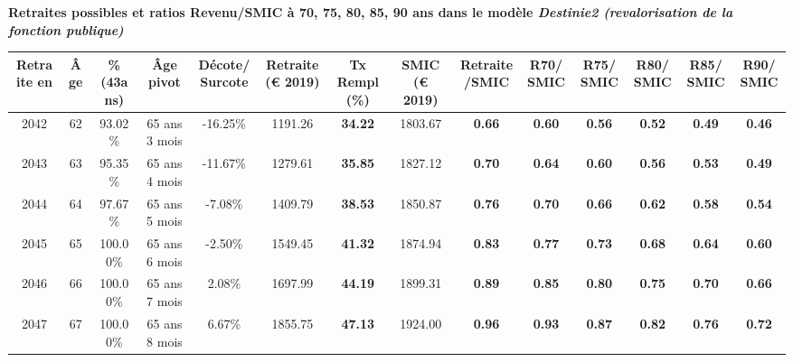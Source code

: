  \vspace{0.1cm} 
{\bf \noindent Retraites possibles et ratios Revenu/SMIC à 70, 75, 80, 85, 90 ans dans le modèle \emph{Destinie2 (revalorisation de la fonction publique)}}  
 
\begin{adjustbox}{max width=\textwidth} 
\begin{tabular}[htb]{|c|c||c|c|c||c|c||c|c||c|c|c|c|c|} 
\hline 
 Retraite en &  Âge &  \%(43ans) &  Âge pivot &  Décote/Surcote &  Retraite (\euro{} 2019) &  Tx Rempl(\%) &  SMIC (\euro{} 2019) &  Retraite/SMIC &  R70/SMIC &  R75/SMIC &  R80/SMIC &  R85/SMIC &  R90/SMIC \\ 
\hline \hline 
 2042 &  62 &  93.02\% &  65 ans 3 mois &  -16.25\% &  1191.26 &  {\bf 34.22} &  1803.67 &  {\bf {\color{red} 0.66}} &  {\bf {\color{red} 0.60}} &  {\bf {\color{red} 0.56}} &  {\bf {\color{red} 0.52}} &  {\bf {\color{red} 0.49}} &  {\bf {\color{red} 0.46}} \\ 
\hline 
 2043 &  63 &  95.35\% &  65 ans 4 mois &  -11.67\% &  1279.61 &  {\bf 35.85} &  1827.12 &  {\bf {\color{red} 0.70}} &  {\bf {\color{red} 0.64}} &  {\bf {\color{red} 0.60}} &  {\bf {\color{red} 0.56}} &  {\bf {\color{red} 0.53}} &  {\bf {\color{red} 0.49}} \\ 
\hline 
 2044 &  64 &  97.67\% &  65 ans 5 mois &  -7.08\% &  1409.79 &  {\bf 38.53} &  1850.87 &  {\bf {\color{red} 0.76}} &  {\bf {\color{red} 0.70}} &  {\bf {\color{red} 0.66}} &  {\bf {\color{red} 0.62}} &  {\bf {\color{red} 0.58}} &  {\bf {\color{red} 0.54}} \\ 
\hline 
 2045 &  65 &  100.00\% &  65 ans 6 mois &  -2.50\% &  1549.45 &  {\bf 41.32} &  1874.94 &  {\bf {\color{red} 0.83}} &  {\bf {\color{red} 0.77}} &  {\bf {\color{red} 0.73}} &  {\bf {\color{red} 0.68}} &  {\bf {\color{red} 0.64}} &  {\bf {\color{red} 0.60}} \\ 
\hline 
 2046 &  66 &  100.00\% &  65 ans 7 mois &  2.08\% &  1697.99 &  {\bf 44.19} &  1899.31 &  {\bf {\color{red} 0.89}} &  {\bf {\color{red} 0.85}} &  {\bf {\color{red} 0.80}} &  {\bf {\color{red} 0.75}} &  {\bf {\color{red} 0.70}} &  {\bf {\color{red} 0.66}} \\ 
\hline 
 2047 &  67 &  100.00\% &  65 ans 8 mois &  6.67\% &  1855.75 &  {\bf 47.13} &  1924.00 &  {\bf {\color{red} 0.96}} &  {\bf {\color{red} 0.93}} &  {\bf {\color{red} 0.87}} &  {\bf {\color{red} 0.82}} &  {\bf {\color{red} 0.76}} &  {\bf {\color{red} 0.72}} \\ 
\hline 
\hline 
\end{tabular} 
\end{adjustbox} 
 
